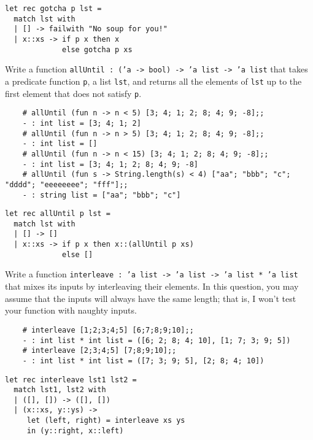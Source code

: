 \documentclass[addpoints]{exam}
\begin{document}
\begin{questions}
  \begin{solutionbox}{3.5cm}
    \begin{verbatim}
let rec gotcha p lst =
  match lst with
  | [] -> failwith "No soup for you!"
  | x::xs -> if p x then x
             else gotcha p xs      
    \end{verbatim}
  \end{solutionbox}

  
  \question 
  Write a function \texttt{allUntil : ('a -> bool) -> 'a list -> 'a list} 
  that takes a predicate function \texttt{p}, a list \texttt{lst}, 
  and returns all the elements of \texttt{lst} up to the first element
  that does not satisfy \texttt{p}.
  \begin{verbatim}
    # allUntil (fun n -> n < 5) [3; 4; 1; 2; 8; 4; 9; -8];;
    - : int list = [3; 4; 1; 2]
    # allUntil (fun n -> n > 5) [3; 4; 1; 2; 8; 4; 9; -8];;
    - : int list = []
    # allUntil (fun n -> n < 15) [3; 4; 1; 2; 8; 4; 9; -8];;
    - : int list = [3; 4; 1; 2; 8; 4; 9; -8]
    # allUntil (fun s -> String.length(s) < 4) ["aa"; "bbb"; "c"; "dddd"; "eeeeeeee"; "fff"];;
    - : string list = ["aa"; "bbb"; "c"]
  \end{verbatim}
  
  \begin{solutionbox}{3.5cm}
    \begin{verbatim}
let rec allUntil p lst =
  match lst with
  | [] -> []
  | x::xs -> if p x then x::(allUntil p xs)
             else []
    \end{verbatim}
  \end{solutionbox}

  
  \question
  Write a function 
  \texttt{interleave : 'a list -> 'a list -> 'a list * 'a list} 
  that mixes its inputs by interleaving their elements.
  In this question, you may assume that the inputs will always have the same length;
  that is, I won't test your function with naughty inputs.
  \begin{verbatim}
    # interleave [1;2;3;4;5] [6;7;8;9;10];;                                   
    - : int list * int list = ([6; 2; 8; 4; 10], [1; 7; 3; 9; 5])
    # interleave [2;3;4;5] [7;8;9;10];;    
    - : int list * int list = ([7; 3; 9; 5], [2; 8; 4; 10])
  \end{verbatim}

  \begin{solutionbox}{4cm}
    \begin{verbatim}
let rec interleave lst1 lst2 =
  match lst1, lst2 with
  | ([], []) -> ([], [])
  | (x::xs, y::ys) ->
     let (left, right) = interleave xs ys
     in (y::right, x::left)
    \end{verbatim}
  \end{solutionbox}


\end{questions}
\end{document}
